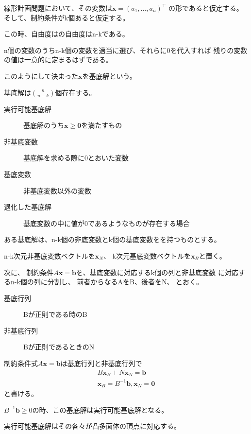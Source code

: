 \documentclass[9pt]{ltjsreport}
\begin{document}
\begin{tcolorbox}[title=基底解、実行可能基底解、基底変数、非基底変数、退化した基底解]
    線形計画問題において、その変数は$\bm{x}=(a_1,\dots,a_n)^\top$
    の形であると仮定する。そして、制約条件がk個あると仮定する。

    この時、自由度はの自由度はn-kである。

    n個の変数のうちn-k個の変数を適当に選び、それらに0を代入すれば
    残りの変数の値は一意的に定まるはずである。

    このようにして決まった$\bm{x}$を基底解という。

    基底解は$\binom{n}{n-k}$個存在する。
    \begin{description}
        \item[実行可能基底解] 基底解のうち$\bm{x}\ge\bm{0}$を満たすもの
        \item[非基底変数] 基底解を求める際に0とおいた変数
        \item[基底変数] 非基底変数以外の変数
        \item[退化した基底解] 基底変数の中に値が0であるようなものが存在する場合
    \end{description}
\end{tcolorbox}
\begin{tcolorbox}[title=基底行列、非基底行列]
    ある基底解は、n-k個の非底変数とk個の基底変数をを持つものとする。
    
    n-k次元非基底変数ベクトルを$\bm{x}_N$、
    k次元基底変数ベクトルを$\bm{x}_B$と置く。
    
    次に、
    制約条件$A\bm{x}=\bm{b}$を、基底変数に対応するk個の列と非基底変数
    に対応するn-k個の列に分割し、
    前者からなるAをB、後者をN、
    とおく。

    \begin{description}
        \item[基底行列]Bが正則である時のB
        \item[非基底行列]Bが正則であるときのN
    \end{description}
\end{tcolorbox}
制約条件式$A\bm{x}=\bm{b}$は基底行列と非基底行列で
\begin{gather}
    B\bm{x}_B+N\bm{x}_N=\bm{b}\\
    \bm{x}_B=B^{-1}\bm{b}, \bm{x}_N=\bm{0}
\end{gather}
と書ける。

$B^{-1}\bm{b}\ge0$の時、この基底解は実行可能基底解となる。

実行可能基底解はその各々が凸多面体の頂点に対応する。
\end{document}
